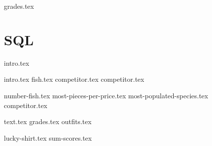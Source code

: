 \documentclass{exam}
\begin{document}
\begin{questions}
  {grades.tex}
\end{questions}

\newpage
\section{SQL}
{intro.tex}
\newpage

{intro.tex}
{fish.tex}
{competitor.tex}
{competitor.tex}

\begin{questions}
  {number-fish.tex}
  {most-pieces-per-price.tex}
  {most-populated-species.tex}
  {competitor.tex}
\end{questions}
\newpage

{text.tex}
{grades.tex}
{outfits.tex}

\begin{questions}
  {lucky-shirt.tex}
  {sum-scores.tex}
\end{questions}
\end{document}
